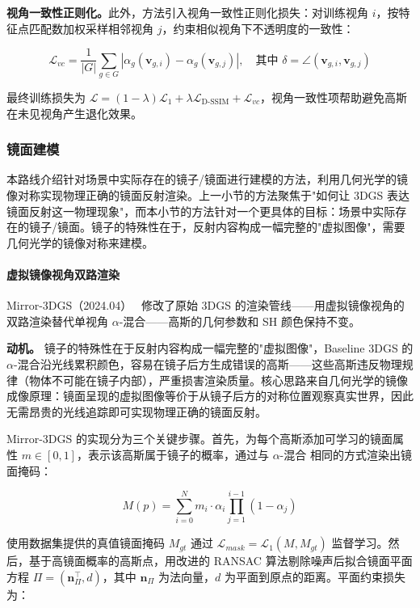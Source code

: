\textbf{视角一致性正则化。}此外，方法引入视角一致性正则化损失：对训练视角 $i$，按特征点匹配数加权采样相邻视角 $j$，约束相似视角下不透明度的一致性：

\begin{equation}
\mathcal{L}_{vc} = \frac{1}{|G|}\sum_{g \in G} |\alpha_g(\mathbf{v}_{g,i}) - \alpha_g(\mathbf{v}_{g,j})|, \quad \text{其中 } \delta = \angle(\mathbf{v}_{g,i}, \mathbf{v}_{g,j})
\end{equation}

最终训练损失为 $\mathcal{L} = (1-\lambda)\mathcal{L}_1 + \lambda \mathcal{L}_{\text{D-SSIM}} + \mathcal{L}_{vc}$，视角一致性项帮助避免高斯在未见视角产生退化效果。

\subsubsection{镜面建模}

本路线介绍针对场景中实际存在的镜子/镜面进行建模的方法，利用几何光学的镜像对称实现物理正确的镜面反射渲染。上一小节的方法聚焦于"如何让 3DGS 表达镜面反射这一物理现象"，而本小节的方法针对一个更具体的目标：场景中实际存在的镜子/镜面。镜子的特殊性在于，反射内容构成一幅完整的"虚拟图像"，需要几何光学的镜像对称来建模。

\paragraph{虚拟镜像视角双路渲染}

Mirror-3DGS（2024.04）~\cite{2404_01168} 修改了原始 3DGS 的渲染管线——用虚拟镜像视角的双路渲染替代单视角 $\alpha$-混合——高斯的几何参数和 SH 颜色保持不变。

\textbf{动机。} 镜子的特殊性在于反射内容构成一幅完整的"虚拟图像"，Baseline 3DGS 的 $\alpha$-混合沿光线累积颜色，容易在镜子后方生成错误的高斯——这些高斯违反物理规律（物体不可能在镜子内部），严重损害渲染质量。核心思路来自几何光学的镜像成像原理：镜面呈现的虚拟图像等价于从镜子后方的对称位置观察真实世界，因此无需昂贵的光线追踪即可实现物理正确的镜面反射。

Mirror-3DGS 的实现分为三个关键步骤。首先，为每个高斯添加可学习的镜面属性 $m \in [0,1]$，表示该高斯属于镜子的概率，通过与 $\alpha$-混合 相同的方式渲染出镜面掩码：

\begin{equation}
M(p) = \sum_{i=0}^{N} m_i \cdot \alpha_i \prod_{j=1}^{i-1}(1 - \alpha_j)
\end{equation}

使用数据集提供的真值镜面掩码 $M_{gt}$ 通过 $\mathcal{L}_{mask} = \mathcal{L}_1(M, M_{gt})$ 监督学习。然后，基于高镜面概率的高斯点，用改进的 RANSAC 算法剔除噪声后拟合镜面平面方程 $\Pi = (\mathbf{n}_\Pi^\top, d)$，其中 $\mathbf{n}_\Pi$ 为法向量，$d$ 为平面到原点的距离。平面约束损失为：

